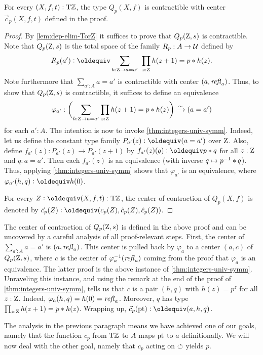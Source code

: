 \documentclass[a4,12pt]{amsart}
\begin{document}
\begin{lemma}\label{lem:guided-null-hmtps}
For every $(X,f,t):{\mathrm{T}\mathbb{Z}}$, the type $Q_p(X,f)$ is contractible
with center $\vec{c}_p(X,f,t)$ defined in the proof.
\end{lemma}
\begin{proof}
  By \cref{lem:dep-elim-TorZ} it suffices to prove that $Q_p(\mathrm{Z},s)$ is contractible.
  Note that $Q_p(\mathrm{Z},s)$ is the total space of the family $R_p : A \to \mathcal{U}$ defined by
  \[
    R_p(a') \defeq \sum_{h:\zet \to a=a'}~\prod_{z:\zet} h(z+1)=p\ct h(z).
  \]
  Note furthermore that $\sum_{a':A} a=a'$ is contractible with center $(a,\mathop{{\it refl}_{a}})$.
  Thus, to show that $Q_p(\mathrm{Z},s)$ is contractible,
  it suffices to define an equivalence
  \[
    \varphi_{a'} : \biggl(\sum_{h:\mathrm{Z} \to a=a'}\prod_{z:\mathrm{Z}} h(z+1)=p* h(z)\biggr) \xrightarrow{\sim}{} (a=a')
  \]
  for each $a':A$.
  The intention is now to invoke \cref{thm:integers-univ-symm}.
  Indeed, let us define the constant type family $P_{a'}(z)\defeq(a=a')$
  over $\mathrm{Z}$. Also, define $f_{a'}(z) : P_{a'}(z) \to P_{a'}(z+1)$
  by $f_{a'}(z)(q) \defeq p \ct q$ for all $z:\mathrm{Z}$ and $q: a=a'$.
  Then each $f_{a'}(z)$ is an equivalence (with inverse $q \mapsto p^{-1}* q$).
  Thus, applying \cref{thm:integers-univ-symm}
  shows that $\varphi_{a'}$ is an equivalence,
  where $\varphi_{a'}(h,q) \defeq h(0)$.

For every $Z\defeq(X,f,t):\TorZ$, the center of contraction of $Q_p(X,f)$ 
is denoted by $\vec{c}_p(Z)\defeq(c_p(Z),\tilde{c}_p(Z),\hat{c}_p(Z))$.
\end{proof}

The center of contraction of $Q_p(\mathrm{Z},s)$ is defined in the above proof 
and can be uncovered by a careful analysis of all proof-relevant steps.
First, the center of $\sum_{a':A} a=a'$ is $(a,\mathop{{\it refl}_{a}})$.
This center is pulled back by $\varphi_{a}$ to a center
$(a,c)$ of $Q_p(\mathrm{Z},s)$, where $c$ is the center of 
$\varphi_{a}^{-1}(\mathop{{\it refl}_{a}})$ coming from the proof
that $\varphi_{a}$ is an equivalence. The latter proof
is the above instance of \cref{thm:integers-univ-symm}.
Unraveling this instance, and using the remark at the
end of the proof of \cref{thm:integers-univ-symm},
tells us that $c$ is a pair $(h,q)$ with $h(z)=p^z$
for all $z:\mathrm{Z}$. Indeed, $\varphi_{a}(h,q) = h(0) = \mathop{{\it refl}_{a}}$.
Moreover, $q$ has type $\prod_{z:\mathrm{Z}} h(z+1)=p* h(z)$.
Wrapping up, $\vec c_p(\pt)\defeq (a,h,q)$.

The analysis in the previous paragraph
means we have achieved one of our goals,
namely that the function $c_p$ from ${\mathrm{T}\mathbb{Z}}$ to $A$ 
maps ${\mathord{\mathrm{pt}}}$ to $a$ definitionally.
We will now deal with the other goal,
namely that $c_p$ acting on $\circlearrowleft$ yields $p$.
\end{document}
